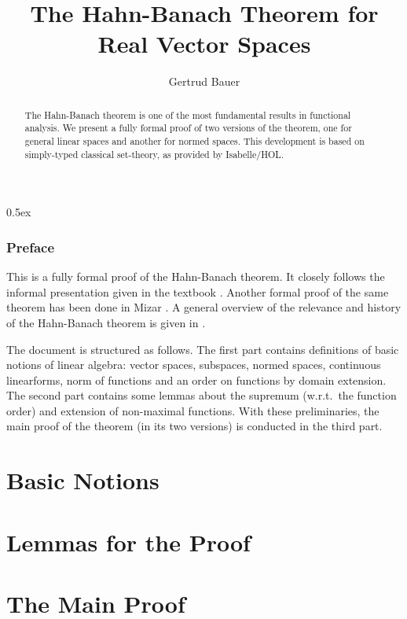 \documentclass[11pt,a4paper,twoside]{article}
\begin{document}
\pagestyle{headings}

\title{The Hahn-Banach Theorem for Real Vector Spaces}
\author{Gertrud Bauer}
\maketitle

\begin{abstract}
  The Hahn-Banach theorem is one of the most fundamental results in functional
  analysis. We present a fully formal proof of two versions of the theorem,
  one for general linear spaces and another for normed spaces.  This
  development is based on simply-typed classical set-theory, as provided by
  Isabelle/HOL.
\end{abstract}


\tableofcontents
\parindent 0pt \parskip 0.5ex

\clearpage
\section{Preface}

This is a fully formal proof of the Hahn-Banach theorem. It closely follows
the informal presentation given in the textbook \cite[\S 36]{Heuser:1986}.
Another formal proof of the same theorem has been done in Mizar
\cite{Nowak:1993}.  A general overview of the relevance and history of the
Hahn-Banach theorem is given in \cite{Narici:1996}.

\medskip The document is structured as follows.  The first part contains
definitions of basic notions of linear algebra: vector spaces, subspaces,
normed spaces, continuous linearforms, norm of functions and an order on
functions by domain extension.  The second part contains some lemmas about the
supremum (w.r.t.\ the function order) and extension of non-maximal functions.
With these preliminaries, the main proof of the theorem (in its two versions)
is conducted in the third part.


\clearpage
\part {Basic Notions}











\clearpage
\part {Lemmas for the Proof}




\clearpage
\part {The Main Proof}




\end{document}
